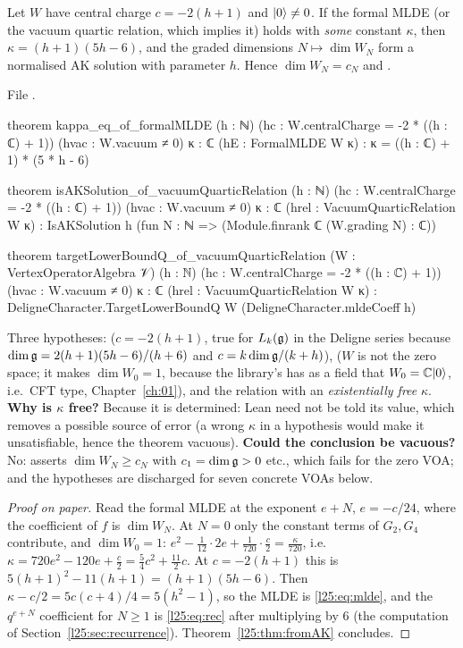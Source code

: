 \begin{theorem}\label{l25:thm:kappa}
Let $W$ have central charge $c=-2(h+1)$ and $|0\rangle\ne0$. If the formal MLDE (or the vacuum
quartic relation, which implies it) holds with \emph{some} constant $\kappa$, then $\kappa=(h+1)(5h-6)$, and the graded dimensions
$N\mapsto\dim W_N$ form a normalised AK solution with parameter $h$. Hence $\dim W_N=c_N$ and
.
\end{theorem}
\noindent File .
\begin{leancode}
theorem kappa_eq_of_formalMLDE (h : ℕ) (hc : W.centralCharge = -2 * ((h : ℂ) + 1))
    (hvac : W.vacuum ≠ 0) {κ : ℂ} (hE : FormalMLDE W κ) :
    κ = ((h : ℂ) + 1) * (5 * h - 6)

theorem isAKSolution_of_vacuumQuarticRelation (h : ℕ)
    (hc : W.centralCharge = -2 * ((h : ℂ) + 1)) (hvac : W.vacuum ≠ 0) {κ : ℂ}
    (hrel : VacuumQuarticRelation W κ) :
    IsAKSolution h (fun N : ℕ => (Module.finrank ℂ (W.grading N) : ℂ))

theorem targetLowerBoundQ_of_vacuumQuarticRelation (W : VertexOperatorAlgebra 𝒱) (h : ℕ)
    (hc : W.centralCharge = -2 * ((h : ℂ) + 1)) (hvac : W.vacuum ≠ 0)
    {κ : ℂ} (hrel : VacuumQuarticRelation W κ) :
    DeligneCharacter.TargetLowerBoundQ W (DeligneCharacter.mldeCoeff h)
\end{leancode}
\begin{dictionary}
Three hypotheses:  ($c=-2(h+1)$, true for $L_k(\mathfrak g)$ in the Deligne series because
$\dim\mathfrak g=2(h+1)(5h-6)/(h+6)$ and $c=k\dim\mathfrak g/(k+h)$),  ($W$ is not the zero space; it
makes $\dim W_0=1$, because the library's  has as a field  that
$W_0={\mathbb{C}}|0\rangle$, i.e.\ CFT type, Chapter~\ref{ch:01}), and the relation with an \emph{existentially free} $\kappa$. \textbf{Why is $\kappa$ free?}
Because it is determined: Lean need not be told its value, which removes a possible source of error (a wrong
$\kappa$ in a hypothesis would make it unsatisfiable, hence the theorem vacuous). \textbf{Could the conclusion be
vacuous?} No:  asserts $\dim W_N\ge c_N$ with $c_1=\dim\mathfrak g>0$ etc., which fails for
the zero VOA; and the hypotheses are discharged for seven concrete VOAs below.
\end{dictionary}
\begin{proof}[Proof on paper]
Read the formal MLDE at the exponent $e+N$, $e=-c/24$, where the coefficient of $f$ is $\dim W_N$. At $N=0$ only
the constant terms of $G_2,G_4$ contribute, and $\dim W_0=1$:
$e^2-\frac{1}{12}\cdot2e+\frac1{720}\cdot\frac c2=\frac{\kappa}{720}$, i.e.\ $\kappa=720e^2-120e+\frac c2
=\frac54c^2+\frac{11}2c$. At $c=-2(h+1)$ this is $5(h+1)^2-11(h+1)=(h+1)(5h-6)$. Then
$\kappa-c/2=5c(c+4)/4=5(h^2-1)$, so the MLDE is \eqref{l25:eq:mlde}, and the $q^{e+N}$ coefficient for $N\ge1$ is
\eqref{l25:eq:rec} after multiplying by $6$ (the computation of Section~\ref{l25:sec:recurrence}).
Theorem~\ref{l25:thm:fromAK} concludes.
\end{proof}
